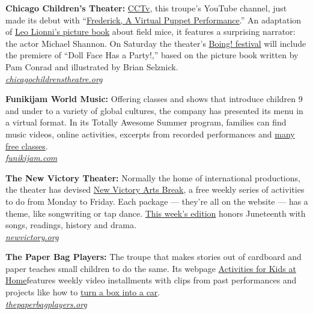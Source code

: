 \textbf{Chicago Children's Theater:}
\href{https://www.youtube.com/channel/UClI9nwq0sLwmxnSC8xvN9lw}{CCTv},
this troupe's YouTube channel, just made its debut with
``\href{https://chicagochildrenstheatre.org/performance/frederick-puppet}{Frederick,
A Virtual Puppet Performance}.'' An adaptation of
\href{https://www.scholastic.com/teachers/books/frederick-by-leo-lionni/}{Leo
Lionni's picture book} about field mice, it features a surprising
narrator: the actor Michael Shannon. On Saturday the theater's
\href{https://chicagochildrenstheatre.org/boing-2020/}{Boing! festival}
will include the premiere of ``Doll Face Has a Party!,'' based on the
picture book written by Pam Conrad and illustrated by Brian Selznick.\\
\href{https://chicagochildrenstheatre.org/}{\emph{chicagochildrenstheatre.org}}

\textbf{Funikijam World Music:} Offering classes and shows that
introduce children 9 and under to a variety of global cultures, the
company has presented its menu in a virtual format. In its Totally
Awesome Summer program, families can find music videos, online
activities, excerpts from recorded performances and
\href{https://www.funikijam.com/find-a-class}{many free classes}.\\
\href{https://www.funikijam.com/}{\emph{funikijam.com}}

\textbf{The New Victory Theater:} Normally the home of international
productions, the theater has devised
\href{https://newvictory.org/stories/category/family-engagement/new-victory-arts-break/}{New
Victory Arts Break}, a free weekly series of activities to do from
Monday to Friday. Each package --- they're all on the website --- has a
theme, like songwriting or tap dance.
\href{https://www.newvictory.org/stories/new-victory-arts-break-juneteenth/}{This
week's edition} honors Juneteenth with songs, readings, history and
drama.\\
\href{https://newvictory.org/}{\emph{newvictory.org}}

\textbf{The Paper Bag Players:} The troupe that makes stories out of
cardboard and paper teaches small children to do the same. Its webpage
\href{https://thepaperbagplayers.org/activities-for-kids-at-home/}{Activities
for Kids at Home}features weekly video installments with clips from past
performances and projects like how to
\href{https://www.youtube.com/watch?time_continue=34\&v=yR1Q1pVj6pc\&feature=emb_title}{turn
a box into a car}.\\
\href{https://thepaperbagplayers.org/}{\emph{thepaperbagplayers.org}}


